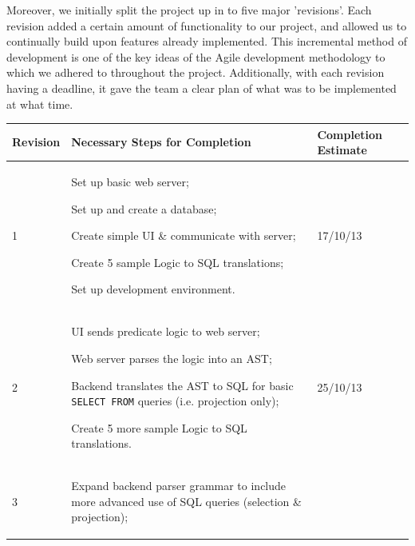\documentclass[a4paper, 11pt]{article}
\begin{document}
    Moreover, we initially split the project up in to five major 'revisions'.
    Each revision added a certain amount of functionality to our project, and
    allowed us to continually build upon features already implemented. This
    incremental method of development is one of the key ideas of the Agile
    development methodology to which we adhered to throughout the project.
     Additionally, with each revision having a
    deadline, it gave the team a clear plan of what was to be implemented at
    what time.

    \begin{table}[H]
      \centering
      \begin{tabular}{| l | p{} | l |}
        \hline
        \textbf{Revision} & \textbf{Necessary Steps for Completion}
          & \textbf{Completion Estimate} \\
        \hline
        1 &
          \begin{compactitem}
            \item Set up basic web server;
            \item Set up and create a database;
            \item Create simple UI \& communicate with server;
            \item Create 5 sample Logic to SQL translations;
            \item Set up development environment.
          \end{compactitem}
          & 17/10/13 \\
        \hline
        2 &
          \begin{compactitem}
            \item UI sends predicate logic to web server;
            \item Web server parses the logic into an AST;
            \item Backend translates the AST to SQL for basic \texttt{SELECT
              FROM} queries (i.e. projection only);
            \item Create 5 more sample Logic to SQL translations.
          \end{compactitem}
          & 25/10/13 \\
        \hline
        3 &
          \begin{compactitem}
            \item Expand backend parser grammar to include more advanced use of
              SQL queries (selection \& projection);

\end{compactitem}
\end{tabular}
\end{table}
\end{document}
